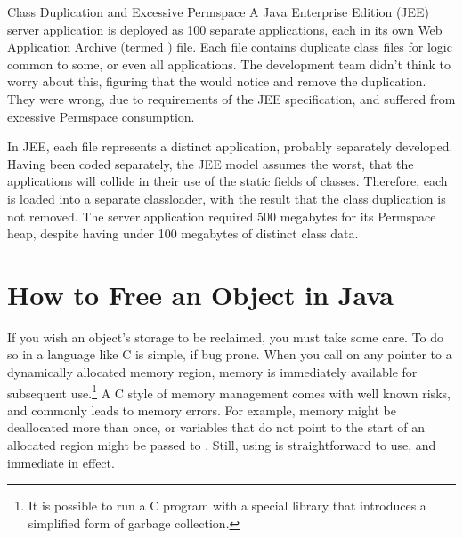 \begin{example}{Class Duplication and Excessive Permspace}
A Java Enterprise Edition (JEE) server application is deployed as 100 separate
applications, each in its own Web Application Archive (termed ) file.
Each  file contains duplicate class files for logic common to some, or even all applications.
The development team didn't think to worry about this, figuring that the
\jre would notice and remove the duplication. They were wrong, due to
requirements of the JEE specification, and suffered from excessive Permspace
consumption.

In JEE, each  file represents a distinct application, probably
separately developed. Having been coded separately, the JEE model assumes the
worst, that the applications will collide in their use of the static fields of
classes. Therefore, each  is loaded into a separate classloader, with
the result that the class duplication is not removed. The server application
required 500 megabytes for its Permspace heap, despite having under 100 megabytes
of distinct class data.
\end{example}



\section{How to Free an Object in Java}
\label{sec:natural-lifetime}

If you wish an object's storage to be reclaimed, you must take some care. To do
so in a language like C is simple, if bug prone. When you call  on any
pointer to a dynamically allocated memory region, memory is immediately available
for subsequent use.\footnote{It is possible to run a C program with a
special  library that introduces a simplified form of garbage
collection.} A C style of memory management comes with well known risks, and
commonly leads to memory errors. For example, memory might be deallocated more
than once, or variables that do not point to the start of an allocated region
might be passed to . Still, using  is straightforward to
use, and immediate in effect.

